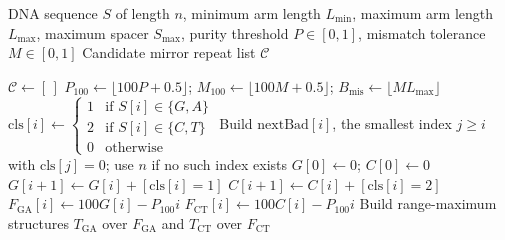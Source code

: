 \documentclass{article}
\begin{document}
\begin{algorithm}
\caption{HSeeker Phase 1: Candidate Enumeration with Purity RMQ Prefilter}
\label{alg:mirror-phase1}
\scriptsize
\begin{algorithmic}[1]
\Require
    DNA sequence $S$ of length $n$,
    minimum arm length $L_{\min}$,
    maximum arm length $L_{\max}$,
    maximum spacer $S_{\max}$,
    purity threshold $P \in [0,1]$,
    mismatch tolerance $M \in [0,1]$
\Ensure Candidate mirror repeat list $\mathcal{C}$

\State $\mathcal{C} \gets [\,]$
\State $P_{100} \gets \lfloor 100P + 0.5 \rfloor$;\;
       $M_{100} \gets \lfloor 100M + 0.5 \rfloor$;\;
       $B_{\mathrm{mis}} \gets \lfloor M L_{\max} \rfloor$
    \State $\mathrm{cls}[i] \gets
        \begin{cases}
            1 & \text{if } S[i]\in\{G,A\}\\
            2 & \text{if } S[i]\in\{C,T\}\\
            0 & \text{otherwise}
        \end{cases}$
\EndFor
\State Build $\mathrm{nextBad}[i]$, the smallest index $j \ge i$ with
       $\mathrm{cls}[j]=0$; use $n$ if no such index exists
\State $G[0]\gets 0$;\; $C[0]\gets 0$
    \State $G[i+1] \gets G[i] + [\mathrm{cls}[i]=1]$
    \State $C[i+1] \gets C[i] + [\mathrm{cls}[i]=2]$
\EndFor
{}
    \State $F_{\mathrm{GA}}[i] \gets 100G[i] - P_{100}i$
    \State $F_{\mathrm{CT}}[i] \gets 100C[i] - P_{100}i$
\EndFor
\State Build range-maximum structures $T_{\mathrm{GA}}$ over $F_{\mathrm{GA}}$
       and $T_{\mathrm{CT}}$ over $F_{\mathrm{CT}}$


\end{algorithmic}
\end{algorithm}
\end{document}
